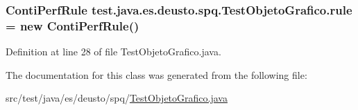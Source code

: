 \subsubsection[{\texorpdfstring{rule}{rule}}]{\setlength{\rightskip}{0pt plus 5cm}Conti\+Perf\+Rule test.\+java.\+es.\+deusto.\+spq.\+Test\+Objeto\+Grafico.\+rule = new Conti\+Perf\+Rule()}\hypertarget{classtest_1_1java_1_1es_1_1deusto_1_1spq_1_1_test_objeto_grafico_ab09daf1234d471e4a3fda9be3d8c3f0c}{}\label{classtest_1_1java_1_1es_1_1deusto_1_1spq_1_1_test_objeto_grafico_ab09daf1234d471e4a3fda9be3d8c3f0c}


Definition at line 28 of file Test\+Objeto\+Grafico.\+java.



The documentation for this class was generated from the following file\+:\begin{DoxyCompactItemize}
\item 
src/test/java/es/deusto/spq/\hyperlink{_test_objeto_grafico_8java}{Test\+Objeto\+Grafico.\+java}\end{DoxyCompactItemize}
